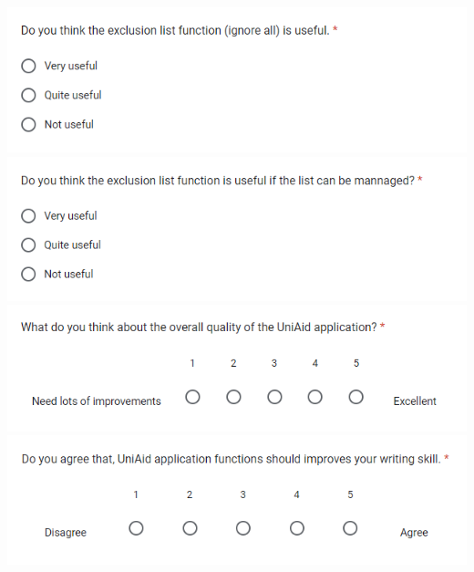 \documentclass[12pt,oneside,openright,a4paper]{cpe-english-project}
\begin{document}
\includegraphics[width=15cm]{./img/Appendix/Survey-2-6.png}
\includegraphics[width=15cm]{./img/Appendix/Survey-2-7.png}
\includegraphics[width=15cm]{./img/Appendix/Survey-2-8.png}
\includegraphics[width=15cm]{./img/Appendix/Survey-2-9.png}


\end{document}
